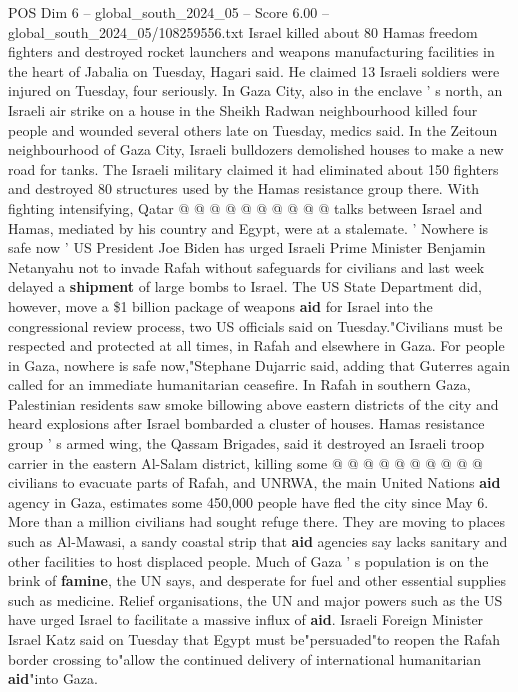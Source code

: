 \begin{textsample}{POS Dim 6 – global\_south\_2024\_05 – Score 6.00 – global\_south\_2024\_05/108259556.txt}
Israel killed about 80 Hamas freedom fighters and destroyed rocket launchers and weapons manufacturing facilities in the heart of Jabalia on Tuesday, Hagari said.
He claimed 13 Israeli soldiers were injured on Tuesday, four seriously.
In Gaza City, also in the enclave ' s north, an Israeli air strike on a house in the Sheikh Radwan neighbourhood killed four people and wounded several others late on Tuesday, medics said.
In the Zeitoun neighbourhood of Gaza City, Israeli bulldozers demolished houses to make a new road for tanks.
The Israeli military claimed it had eliminated about 150 fighters and destroyed 80 structures used by the Hamas resistance group there.
With fighting intensifying, Qatar @ @ @ @ @ @ @ @ @ @ talks between Israel and Hamas, mediated by his country and Egypt, were at a stalemate. ' Nowhere is safe now ' US President Joe Biden has urged Israeli Prime Minister Benjamin Netanyahu not to invade Rafah without safeguards for civilians and last week delayed a \textbf{shipment} of large bombs to Israel.
The US State Department did, however, move a \$1 billion package of weapons \textbf{aid} for Israel into the congressional review process, two US officials said on Tuesday."Civilians must be respected and protected at all times, in Rafah and elsewhere in Gaza.
For people in Gaza, nowhere is safe now,"Stephane Dujarric said, adding that Guterres again called for an immediate humanitarian ceasefire.
In Rafah in southern Gaza, Palestinian residents saw smoke billowing above eastern districts of the city and heard explosions after Israel bombarded a cluster of houses.
Hamas resistance group ' s armed wing, the Qassam Brigades, said it destroyed an Israeli troop carrier in the eastern Al-Salam district, killing some @ @ @ @ @ @ @ @ @ @ civilians to evacuate parts of Rafah, and UNRWA, the main United Nations \textbf{aid} agency in Gaza, estimates some 450,000 people have fled the city since May 6.
More than a million civilians had sought refuge there.
They are moving to places such as Al-Mawasi, a sandy coastal strip that \textbf{aid} agencies say lacks sanitary and other facilities to host displaced people.
Much of Gaza ' s population is on the brink of \textbf{famine}, the UN says, and desperate for fuel and other essential supplies such as medicine.
Relief organisations, the UN and major powers such as the US have urged Israel to facilitate a massive influx of \textbf{aid}.
Israeli Foreign Minister Israel Katz said on Tuesday that Egypt must be"persuaded"to reopen the Rafah border crossing to"allow the continued delivery of international humanitarian \textbf{aid}"into Gaza.

\end{textsample}
